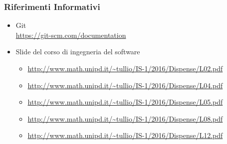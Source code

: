 	    \subsubsection{Riferimenti Informativi}
        \begin{itemize}
        \item Git \\
        \url{https://git-scm.com/documentation}
         \item Slide del corso di ingegneria del software
          \begin{itemize}
           \item \url{http://www.math.unipd.it/~tullio/IS-1/2016/Dispense/L02.pdf}
           \item \url{http://www.math.unipd.it/~tullio/IS-1/2016/Dispense/L04.pdf}
           \item \url{http://www.math.unipd.it/~tullio/IS-1/2016/Dispense/L05.pdf}
           \item \url{http://www.math.unipd.it/~tullio/IS-1/2016/Dispense/L08.pdf}
           \item \url{http://www.math.unipd.it/~tullio/IS-1/2016/Dispense/L12.pdf}
          \end{itemize}
        \end{itemize}
